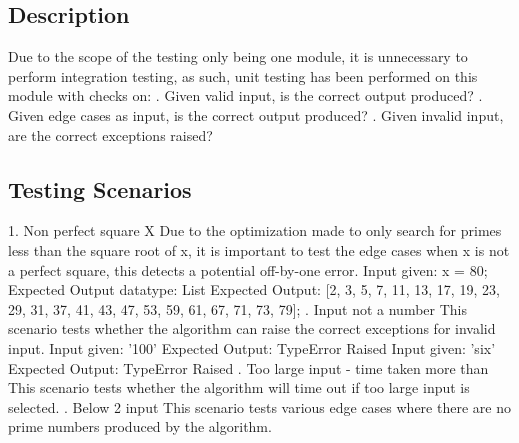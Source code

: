 \documentclass[]{article}
\begin{document}
\subsection{Description}
Due to the scope of the testing only being one module, it is unnecessary to perform integration testing, as such, unit testing has been performed on this module with checks on:
. Given valid input, is the correct output produced?
. Given edge cases as input, is the correct output produced?
. Given invalid input, are the correct exceptions raised?


\subsection{Testing Scenarios}
1. Non perfect square X
\hfil \newline
Due to the optimization made to only search for primes less than the square root of x, it is important to test the
edge cases when x is not a perfect square, this detects a potential off-by-one error.
\hfil \newline
Input given: x = 80;
     \hfil \newline
Expected Output datatype: List
     \hfil \newline
Expected Output: [2, 3, 5, 7, 11, 13, 17, 19, 23, 29, 31, 37, 41, 43, 47, 53, 59, 61, 67, 71, 73, 79];
\hfil {}. Input not a number
\hfil \newline
This scenario tests whether the algorithm can raise the correct exceptions for invalid input.
\hfil \newline
Input given: '100'
    \hfil \newline
Expected Output: TypeError Raised
\hfil \newline
    Input given: 'six'
    \hfil \newline
    Expected Output: TypeError Raised
\hfil {}. Too large input - time taken more than
\hfil \newline
This scenario tests whether the algorithm will time out if too large input is selected.
\hfil {}. Below 2 input
\hfil \newline
This scenario tests various edge cases where there are no prime numbers produced by the algorithm.
\hfil \newline
\end{document}
